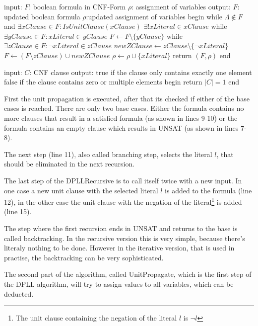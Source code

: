 \begin{adjustbox}{width=\columnwidth}
\begin{algorithm}[caption={UnitPropagate}, label={algUnitProgagate}]
 input: $F$: boolean formula in CNF-Form
	$\rho$: assignment of variables
 output: $F$: updated boolean formula
	$\rho$:updated assignment of variables
 begin
   while $\Lambda \notin F$ and $\exists xClause \in F: IsUnitClause(xClause)$
	$\exists! xLiteral \in xClause$
	while $\exists yClause \in F: xLiteral \in yClause$
		$F \gets F \setminus \{yClause\}$     
	while $\exists zClause \in F: \lnot xLiteral \in zClause$
		$newZClause \gets zClause \setminus \{\lnot xLiteral\}$
		$F \gets (F \setminus zClause) \cup newZClause$
	$\rho \gets \rho \cup \{xLiteral\}$
   return $(F, \rho)$
 end
\end{algorithm}
\end{adjustbox}
\begin{algorithm}[caption={IsUnitClause}, label={algIsUnitClause}]
 input: $C$: CNF clause
 output: true if the clause only contains
		exactly one element
	false if the clause contains zero 
		or multiple elements
 begin
   return $|C| = 1$
 end
\end{algorithm}

First the unit propagation is executed, after that its checked if either of the base cases is reached. 
There are only two base cases. Either the formula contains no more clauses that result in a satisfied formula (as shown in lines 9-10) or the formula contains an empty clause which results in UNSAT (as shown in lines 7-8).

The next step (line 11), also called branching step, selects the literal $l$, that should be eliminated in the next recursion.

The last step of the DPLLRecursive is to call itself twice with a new input. In one case a new unit clause with the selected literal $l$ is added to the formula (line 12), in the other case the unit clause with the negation of the literal\footnote{The unit clause containing the negation of the literal $l$ is $\lnot l$} is added (line 15).

The step where the first recursion ends in UNSAT and returns to the base is called backtracking. In the recursive version this is very simple, because there's literaly nothing to be done. However in the iterative version, that is used in practise, the backtracking can be very sophisticated.

The second part of the algorithm, called UnitPropagate, which is the first step of the DPLL algorithm, will try to assign values to all variables, which can be deducted.

